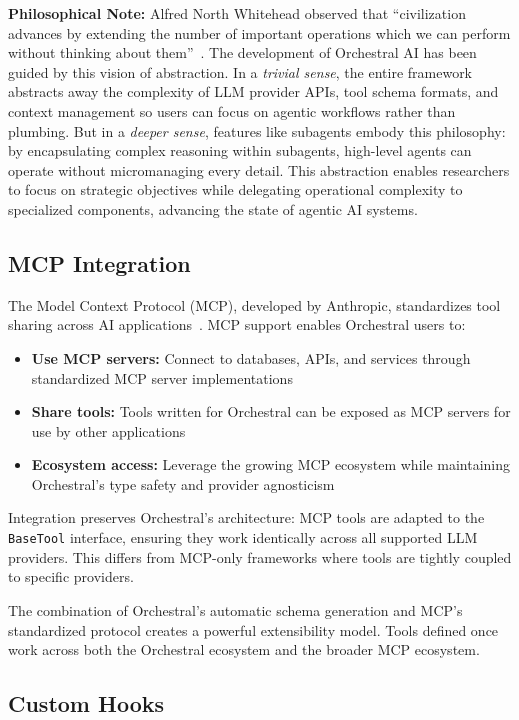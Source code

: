 \documentclass{article}
\begin{document}
\textbf{Philosophical Note:}
Alfred North Whitehead observed that ``civilization advances by extending the number of important operations which we can perform without thinking about them''~\cite{whitehead1911}. The development of Orchestral AI has been guided by this vision of abstraction.
In a \emph{trivial sense}, the entire framework abstracts away the complexity of LLM provider APIs, tool schema formats, and context management so users can focus on agentic workflows rather than plumbing.
But in a \emph{deeper sense}, features like subagents embody this philosophy: by encapsulating complex reasoning within subagents, high-level agents can operate without micromanaging every detail. This abstraction enables researchers to focus on strategic objectives while delegating operational complexity to specialized components, advancing the state of agentic AI systems.


\subsection{MCP Integration}

The Model Context Protocol (MCP), developed by Anthropic, standardizes tool sharing across AI applications~\cite{claude-sdk}. MCP support enables Orchestral users to:

\begin{itemize}
    \item \textbf{Use MCP servers:} Connect to databases, APIs, and services through standardized MCP server implementations
    \item \textbf{Share tools:} Tools written for Orchestral can be exposed as MCP servers for use by other applications
    \item \textbf{Ecosystem access:} Leverage the growing MCP ecosystem while maintaining Orchestral's type safety and provider agnosticism
\end{itemize}

Integration preserves Orchestral's architecture: MCP tools are adapted to the \texttt{BaseTool} interface, ensuring they work identically across all supported LLM providers. This differs from MCP-only frameworks where tools are tightly coupled to specific providers.

The combination of Orchestral's automatic schema generation and MCP's standardized protocol creates a powerful extensibility model. Tools defined once work across both the Orchestral ecosystem and the broader MCP ecosystem.

\subsection{Custom Hooks}\label{sec:custom-hooks}
\end{document}
